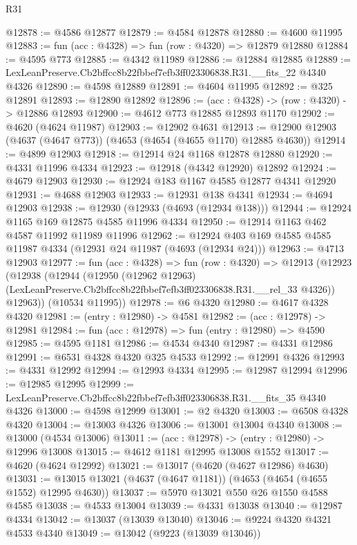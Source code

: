 \begin{lexlean}{R31}
\begin{coremodule}
@12878 := @4586 @12877
@12879 := @4584 @12878
@12880 := @4600 @11995
@12883 := fun (acc : @4328) => fun (row : @4320) => @12879 @12880
@12884 := @4595 @773
@12885 := @4342 @11989
@12886 := @12884 @12885
@12889 := LexLeanPreserve.Cb2bffcc8b22fbbef7efb3ff023306838.R31.__fits_22 @4340 @4326
@12890 := @4598 @12889
@12891 := @4604 @11995
@12892 := @325 @12891
@12893 := @12890 @12892
@12896 := (acc : @4328) -> (row : @4320) -> @12886 @12893
@12900 := @4612 @773 @12885 @12893 @1170
@12902 := @4620 (@4624 @11987)
@12903 := @12902 @4631
@12913 := @12900 @12903 (@4637 (@4647 @773)) (@4653 (@4654 (@4655 @1170) @12885 @4630))
@12914 := @4899 @12903
@12918 := @12914 @24 @1168 @12878 @12880
@12920 := @4331 @11996 @4334
@12923 := @12918 (@4342 @12920) @12892
@12924 := @4679 @12903
@12930 := @12924 @183 @1167 @4585 @12877 @4341 @12920
@12931 := @4688 @12903
@12933 := @12931 @138 @4341
@12934 := @4694 @12903
@12938 := @12930 (@12933 (@4693 (@12934 @138)))
@12944 := @12924 @1165 @169 @12875 @4585 @11996 @4334
@12950 := @12914 @1163 @462 @4587 @11992 @11989 @11996
@12962 := @12924 @403 @169 @4585 @4585 @11987 @4334 (@12931 @24 @11987 (@4693 (@12934 @24)))
@12963 := @4713 @12903
@12977 := fun (acc : @4328) =>
  fun (row : @4320) =>
  @12913
    (@12923
      (@12938
        (@12944
          (@12950
            (@12962 @12963)
            (LexLeanPreserve.Cb2bffcc8b22fbbef7efb3ff023306838.R31.__rel_33 @4326))
          @12963))
      (@10534 @11995))
@12978 := @6 @4320
@12980 := @4617 @4328 @4320
@12981 := (entry : @12980) -> @4581
@12982 := (acc : @12978) -> @12981
@12984 := fun (acc : @12978) => fun (entry : @12980) => @4590
@12985 := @4595 @1181
@12986 := @4534 @4340
@12987 := @4331 @12986
@12991 := @6531 @4328 @4320 @325 @4533
@12992 := @12991 @4326
@12993 := @4331 @12992
@12994 := @12993 @4334
@12995 := @12987 @12994
@12996 := @12985 @12995
@12999 := LexLeanPreserve.Cb2bffcc8b22fbbef7efb3ff023306838.R31.__fits_35 @4340 @4326
@13000 := @4598 @12999
@13001 := @2 @4320
@13003 := @6508 @4328 @4320
@13004 := @13003 @4326
@13006 := @13001 @13004 @4340
@13008 := @13000 (@4534 @13006)
@13011 := (acc : @12978) -> (entry : @12980) -> @12996 @13008
@13015 := @4612 @1181 @12995 @13008 @1552
@13017 := @4620 (@4624 @12992)
@13021 := @13017 (@4620 (@4627 @12986) @4630)
@13031 := @13015 @13021 (@4637 (@4647 @1181)) (@4653 (@4654 (@4655 @1552) @12995 @4630))
@13037 := @5970 @13021 @550 @26 @1550 @4588 @4585
@13038 := @4533 @13004
@13039 := @4331 @13038
@13040 := @12987 @4334
@13042 := @13037 (@13039 @13040)
@13046 := @9224 @4320 @4321 @4533 @4340
@13049 := @13042 (@9223 (@13039 @13046))

\end{coremodule}
\end{lexlean}
